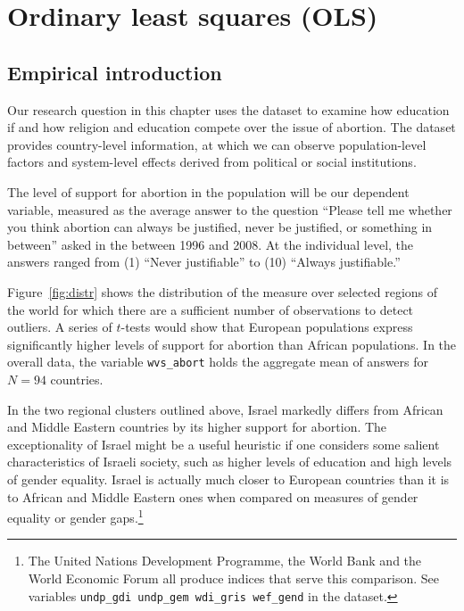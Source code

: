 %
%
%
\section{Ordinary least squares (OLS)}

	\subsection{Empirical introduction}

Our research question in this chapter uses the \QOG{} dataset to examine how education if and how religion and education compete over the issue of abortion. The dataset provides country-level information, at which we can observe population-level factors and system-level effects derived from political or social institutions.

The level of support for abortion in the population will be our dependent variable, measured as the average answer to the question ``Please tell me whether you think abortion can always be justified, never be justified, or something in between'' asked in the \WVS{} between 1996 and 2008. At the individual level, the answers ranged from (1) ``Never justifiable'' to (10) ``Always justifiable.''

Figure~\ref{fig:distr} shows the distribution of the measure over selected regions of the world for which there are a sufficient number of observations to detect outliers. A series of $t$-tests would show that European populations express significantly higher levels of support for abortion than African populations. In the overall \QOG{} data, the variable \texttt{wvs\_abort} holds the aggregate mean of answers for $N = 94$ countries. 

In the two regional clusters outlined above, Israel markedly differs from African and Middle Eastern countries by its higher support for abortion. The exceptionality of Israel might be a useful heuristic if one considers some salient characteristics of Israeli society, such as higher levels of education and high levels of gender equality. Israel is actually much closer to European countries than it is to African and Middle Eastern ones when compared on measures of gender equality or gender gaps.\footnote{\label{fn:gdi_gem} The United Nations Development Programme, the World Bank and the World Economic Forum all produce indices that serve this comparison. See variables \texttt{undp\_gdi undp\_gem wdi\_gris wef\_gend} in the \QOG{} dataset.}

